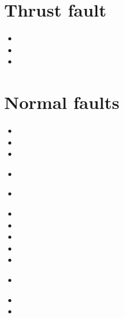 \section{Thrust fault} 

\begin{scriptsize}
\begin{itemize}
\item[\nineteenninety] 
\item[\nineteenninetytwo] 
\item[\twothousandfourteen] 
\end{itemize}
\end{scriptsize}


\section{Normal faults} 

\begin{scriptsize}
\begin{itemize}
\item[\nineteenninetythree]
\item[\nineteenninetysix]
\item[\nineteenninetyseven]
\item[\twothousand]
 \\
\item[\twothousandtwo]
\\
\item[\twothousandeight]
\item[\twothousandfive]
\item[\twothousandeight]
\item[\twothousandnine]
\item[\twothousandfourteen]
\item[\twothousandfifteen]
\\
\item[\twothousandsixteen]
\item[\twothousandtwentytwo]
\end{itemize}
\end{scriptsize}

